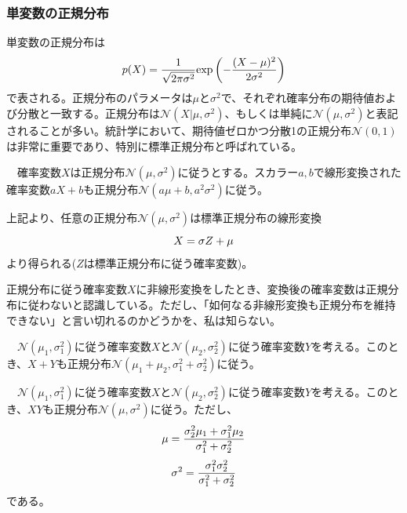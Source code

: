 \documentclass[dvipdfmx, 9pt, a4paper]{jsarticle}
\begin{document}
\subsubsection{単変数の正規分布}
単変数の正規分布は
\begin{equation}
p(X)=\frac{1}{\sqrt{2\pi \sigma^2}}{\rm exp}\left( -\frac{(X-\mu)^2}{2\sigma^2} \right)
\end{equation}
で表される。正規分布のパラメータは$\mu$と$\sigma^2$で、それぞれ確率分布の期待値および分散と一致する。正規分布は$\mathcal{N}(X|\mu, \sigma^2)$、もしくは単純に$\mathcal{N}(\mu, \sigma^2)$と表記されることが多い。統計学において、期待値ゼロかつ分散1の正規分布$\mathcal{N}(0,1)$は非常に重要であり、特別に標準正規分布と呼ばれている。
\begin{tcolorbox}[title=正規分布の線形変換]
　確率変数$X$は正規分布$\mathcal{N}(\mu, \sigma^2)$に従うとする。スカラー$a, b$で線形変換された確率変数$aX+b$も正規分布$\mathcal{N}(a\mu+b, a^2\sigma^2)$に従う。
\end{tcolorbox}
上記より、任意の正規分布$\mathcal{N}(\mu, \sigma^2)$は標準正規分布の線形変換
\begin{equation}
X=\sigma Z+\mu \notag
\end{equation}
より得られる($Z$は標準正規分布に従う確率変数)。\par
正規分布に従う確率変数$X$に非線形変換をしたとき、変換後の確率変数は正規分布に従わないと認識している。ただし、「如何なる非線形変換も正規分布を維持できない」と言い切れるのかどうかを、私は知らない。
\begin{tcolorbox}[title=正規分布の和]
　$\mathcal{N}(\mu_1, \sigma_1^2)$に従う確率変数$X$と$\mathcal{N}(\mu_2, \sigma_2^2)$に従う確率変数$Y$を考える。このとき、$X+Y$も正規分布$\mathcal{N}(\mu_1+\mu_2, \sigma_1^2+\sigma_2^2)$に従う。
\end{tcolorbox}
\begin{tcolorbox}[title=正規分布の積]
　$\mathcal{N}(\mu_1, \sigma_1^2)$に従う確率変数$X$と$\mathcal{N}(\mu_2, \sigma_2^2)$に従う確率変数$Y$を考える。このとき、$XY$も正規分布$\mathcal{N}(\mu, \sigma^2)$に従う。ただし、
\begin{equation}
\mu=\frac{\sigma^2_2\mu_1+\sigma^2_1\mu_2}{\sigma^2_1+\sigma^2_2} \notag
\end{equation}
\begin{equation}
\sigma^2=\frac{\sigma^2_1\sigma^2_2}{\sigma^2_1+\sigma^2_2} \notag
\end{equation}
である。
\end{tcolorbox}
\end{document}
